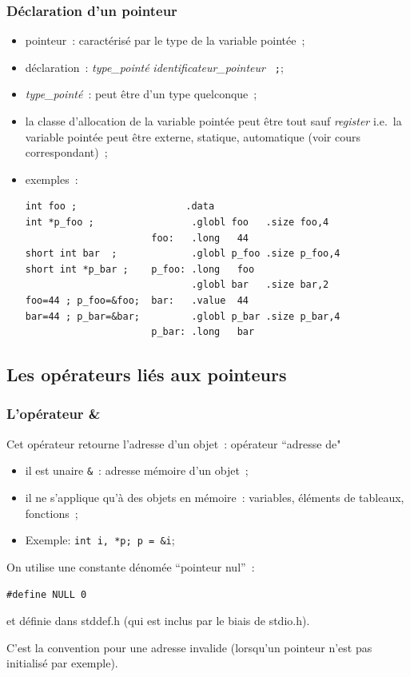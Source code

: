 \begin{frame}[fragile]
\frametitle{D\'eclaration d'un pointeur}
\begin{itemize}
  \item pointeur~: caract\'eris\'e par le type de la variable point\'ee~;
  \item d\'eclaration~: {\it type\_point\'e} {\tt *}{\it identificateur\_pointeur} {\tt
      ;};
  \item {\it type\_point\'e}~: peut \^etre d'un type quelconque~;
  \item la classe d'allocation de la variable point\'ee peut \^etre
    tout sauf {\it register} i.e.\ la variable point\'ee peut \^etre
    externe, statique, automatique (voir cours correspondant)~;
  \item exemples~:

\begin{verbatim}
int foo ;                   .data                   
int *p_foo ;                 .globl foo   .size foo,4        
                      foo:   .long   44            
short int bar  ;             .globl p_foo .size p_foo,4    
short int *p_bar ;    p_foo: .long   foo           
                             .globl bar   .size bar,2        
foo=44 ; p_foo=&foo;  bar:   .value  44            
bar=44 ; p_bar=&bar;         .globl p_bar .size p_bar,4    
                      p_bar: .long   bar             
\end{verbatim}

\end{itemize}

\end{frame}
\begin{frame}
    \section{Les op\'erateurs li\'es aux pointeurs}
    \frametitle{L'op\'erateur \&} 
    Cet op\'erateur retourne l'adresse d'un objet~: op\'erateur
    ``adresse de"
    \begin{itemize}
    \item il est unaire {\tt \&}~: adresse m\'emoire d'un objet~;
    \item il ne s'applique qu'\`a des objets en m\'emoire~: variables,
      \'el\'ements de tableaux, fonctions~;
    \item Exemple: {\tt int i, *p; p = \&i};
    \end{itemize}
    \par\bigskip
    
    On utilise une constante d\'enom\'ee ``pointeur nul''~: 
    \begin{center}
          {\tt \#define NULL 0}
    \end{center}
    et d\'efinie dans stddef.h (qui est inclus par le biais de
    stdio.h).  
    \par
    C'est la convention pour une adresse invalide
    (lorsqu'un pointeur n'est pas initialis\'e par exemple).
  \end{frame}
